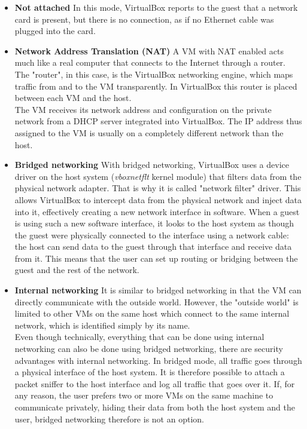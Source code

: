\documentclass[a4paper, 12pt, titlepage]{report}
\begin{document}
\begin{itemize}
\item \textbf{Not attached} In this mode, VirtualBox reports to the guest that a network card is present, but there is no connection, as if no Ethernet cable was plugged into the card.
\item \textbf{Network Address Translation (NAT)} A VM with NAT enabled acts much like a real computer that connects to the Internet through a router. The "router", in this case, is the VirtualBox networking engine, which maps traffic from and to the VM transparently. In VirtualBox this router is placed between each VM and the host.
\\
The VM  receives its network address and configuration on the private network from a DHCP server integrated into VirtualBox. The IP address thus assigned to the VM is usually on a completely different network than the host.

\item \textbf{Bridged networking} With bridged networking, VirtualBox uses a device driver on the host system (\textit{vboxnetflt} kernel module) that filters data from the physical network adapter. That is why it is called "network filter" driver. This allows VirtualBox to intercept data from the physical network and inject data into it, effectively creating a new network interface in software. When a guest is using such a new software interface, it looks to the host system as though the guest were physically connected to the interface using a network cable: the host can send data to the guest through that interface and receive data from it. This means that the user can set up routing or bridging between the guest and the rest of the network.
\item \textbf{Internal networking} It is similar to bridged networking in that the VM can directly communicate with the outside world. However, the "outside world" is limited to other VMs on the same host which connect to the same internal network, which is identified simply by its name.
\\
Even though technically, everything that can be done using internal networking can also be done using bridged networking, there are security advantages with internal networking. In bridged mode, all traffic goes through a physical interface of the host system. It is therefore possible to attach a packet sniffer to the host interface and log all traffic that goes over it. If, for any reason, the user prefers two or more VMs on the same machine to communicate privately, hiding their data from both the host system and the user, bridged networking therefore is not an option.


\end{itemize}
\end{document}
